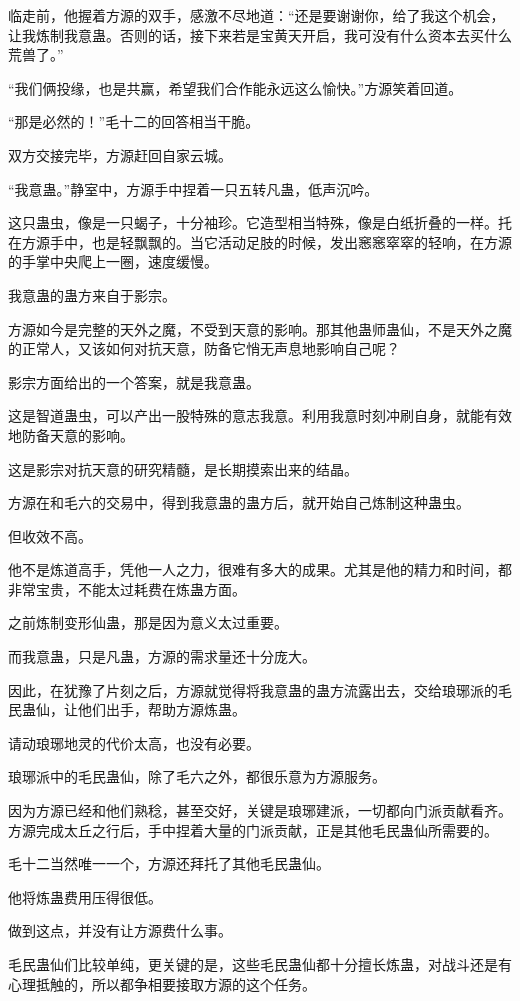 \begin{this_body}
临走前，他握着方源的双手，感激不尽地道：“还是要谢谢你，给了我这个机会，让我炼制我意蛊。否则的话，接下来若是宝黄天开启，我可没有什么资本去买什么荒兽了。”

“我们俩投缘，也是共赢，希望我们合作能永远这么愉快。”方源笑着回道。

“那是必然的！”毛十二的回答相当干脆。

双方交接完毕，方源赶回自家云城。

“我意蛊。”静室中，方源手中捏着一只五转凡蛊，低声沉吟。

这只蛊虫，像是一只蝎子，十分袖珍。它造型相当特殊，像是白纸折叠的一样。托在方源手中，也是轻飘飘的。当它活动足肢的时候，发出窸窸窣窣的轻响，在方源的手掌中央爬上一圈，速度缓慢。

我意蛊的蛊方来自于影宗。

方源如今是完整的天外之魔，不受到天意的影响。那其他蛊师蛊仙，不是天外之魔的正常人，又该如何对抗天意，防备它悄无声息地影响自己呢？

影宗方面给出的一个答案，就是我意蛊。

这是智道蛊虫，可以产出一股特殊的意志我意。利用我意时刻冲刷自身，就能有效地防备天意的影响。

这是影宗对抗天意的研究精髓，是长期摸索出来的结晶。

方源在和毛六的交易中，得到我意蛊的蛊方后，就开始自己炼制这种蛊虫。

但收效不高。

他不是炼道高手，凭他一人之力，很难有多大的成果。尤其是他的精力和时间，都非常宝贵，不能太过耗费在炼蛊方面。

之前炼制变形仙蛊，那是因为意义太过重要。

而我意蛊，只是凡蛊，方源的需求量还十分庞大。

因此，在犹豫了片刻之后，方源就觉得将我意蛊的蛊方流露出去，交给琅琊派的毛民蛊仙，让他们出手，帮助方源炼蛊。

请动琅琊地灵的代价太高，也没有必要。

琅琊派中的毛民蛊仙，除了毛六之外，都很乐意为方源服务。

因为方源已经和他们熟稔，甚至交好，关键是琅琊建派，一切都向门派贡献看齐。方源完成太丘之行后，手中捏着大量的门派贡献，正是其他毛民蛊仙所需要的。

毛十二当然唯一一个，方源还拜托了其他毛民蛊仙。

他将炼蛊费用压得很低。

做到这点，并没有让方源费什么事。

毛民蛊仙们比较单纯，更关键的是，这些毛民蛊仙都十分擅长炼蛊，对战斗还是有心理抵触的，所以都争相要接取方源的这个任务。


\end{this_body}
